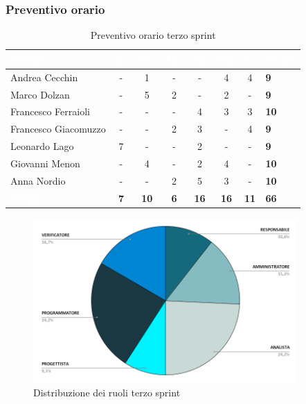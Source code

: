 \subsubsection{Preventivo orario}
{
\setlength{\tabcolsep}{10pt}
\renewcommand{\arraystretch}{1.5}
\begin{table}[h!]
    \centering
    \begin{tabularx}{\textwidth}{| l | c | c | c | c | c | c | X |}
        \hline
        \rowcolor{headerrow} \textbf{\textcolor{white}{Membro}} & \textbf{\textcolor{white}{R.}} & \textbf{\textcolor{white}{Am.}} & \textbf{\textcolor{white}{Pj.}} & \textbf{\textcolor{white}{An.}} & \textbf{\textcolor{white}{Pg.}} & \textbf{\textcolor{white}{V.}} & \textbf{\textcolor{white}{Totale}} \\
        \hline
        Andrea Cecchin & - & 1 & - & - & 4 & 4 & \textbf{9} \\
        \hline
        Marco Dolzan & - & 5 & 2 & - & 2 & - & \textbf{9} \\
        \hline
        Francesco Ferraioli & - & - & - & 4 & 3 & 3 & \textbf{10} \\
        \hline  
        Francesco Giacomuzzo & - & - & 2 & 3 & - & 4 & \textbf{9} \\
        \hline
        Leonardo Lago & 7 & - & - & 2 & - & - & \textbf{9} \\
        \hline
        Giovanni Menon & - & 4 & - & 2 & 4 & - & \textbf{10} \\
        \hline
        Anna Nordio & - & - & 2 & 5 & 3 & - & \textbf{10} \\
        \hline
    \cellcolor{headerrow} \textbf{\textcolor{white}{Totale}} & \textbf{7} & \textbf{10} & \textbf{6} & \textbf{16} & \textbf{16} & \textbf{11} & \textbf{66} \\
        \hline
    \end{tabularx} 
    \caption{Preventivo orario terzo sprint}
    \label{tab:preventivoorarioterzosprint}
\end{table}
}

\begin{figure}[h!]
    \centering
    \includegraphics[width=0.9\textwidth]{prev3ruoli.png}
    \caption{Distribuzione dei ruoli terzo sprint}
    \label{fig:preventivoorarioterzosprint}
\end{figure}

